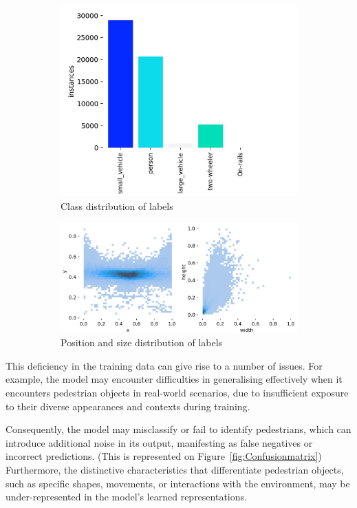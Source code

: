 \begin{figure}[ht]
    \centering
    \begin{subfigure}[h]{\textwidth}
        \includegraphics[width=0.8\linewidth]{src/figures/LabelClassDistr}
        \caption{Class distribution of labels}
    \end{subfigure}
    \begin{subfigure}[h]{\textwidth}
        \includegraphics[width=1\linewidth]{src/figures/LabelPositionAndSizeDistr.png}
        \caption{Position and size  distribution of labels}
    \end{subfigure}
    \caption{ }
    \label{fig:Label_distribution}
\end{figure}
\newpage
This deficiency in the training data can give rise to a number of issues.
For example, the model may encounter difficulties in generalising effectively when it encounters pedestrian objects in real-world scenarios, due to insufficient exposure to their diverse appearances and contexts during training.

Consequently, the model may misclassify or fail to identify pedestrians, which can introduce additional noise in its output, manifesting as false negatives or incorrect predictions. (This is represented on Figure~\ref{fig:Confusionmatrix})
Furthermore, the distinctive characteristics that differentiate pedestrian objects, such as specific shapes, movements, or interactions with the environment, may be under-represented in the model's learned representations.

